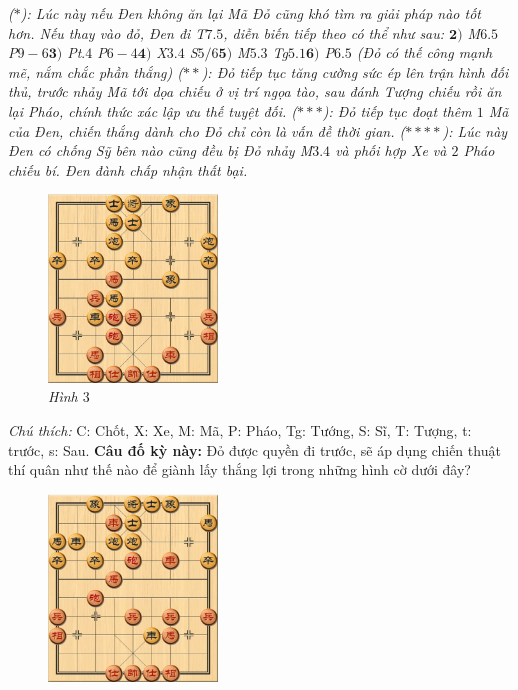 \begin{multicols}{2}
	\vskip 0.1cm
	\textit{($*$): Lúc này nếu Đen không ăn lại Mã Đỏ cũng khó tìm ra giải pháp nào tốt hơn. Nếu thay vào đỏ, Đen đi T$7.5$, diễn biến tiếp theo có thể như sau: $\pmb{2)}$ M$6.5$ P$9-6$\quad $\pmb{3)}$ Pt$.4$ P$6-4$\quad $\pmb{4)}$ X$3.4$ S$5/6$\quad $\pmb{5)}$ M$5.3$ Tg$5.1$\quad $\pmb{6)}$ P$6.5$ (Đỏ có thế công mạnh mẽ, nắm chắc phần thắng)
	\vskip 0.1cm
	($**$): Đỏ tiếp tục tăng cường sức ép lên trận hình đối thủ, trước nhảy Mã tới dọa chiếu ở vị trí ngọa tào, sau đánh Tượng chiếu rồi ăn lại Pháo, chính thức xác lập ưu thế tuyệt đối.
	\vskip 0.1cm
	($***$): Đỏ tiếp tục đoạt thêm $1$ Mã của Đen, chiến thắng dành cho Đỏ chỉ còn là vấn đề thời gian.
	\vskip 0.1cm
	($****$): Lúc này Đen có chống Sỹ bên nào cũng đều bị Đỏ nhảy M$3.4$ và phối hợp Xe và $2$ Pháo chiếu bí. Đen đành chấp nhận thất bại.}
	\begin{figure}[H]
		\vspace*{-5pt}
		\centering
		\captionsetup{labelformat= empty, justification=centering}
		\includegraphics[width= 0.4\textwidth]{3}
		\caption{\small\textit{\color{gocco}Hình $3$}}
		\vspace*{-10pt}
	\end{figure}
	\textit{Chú thích:} C: Chốt, X: Xe, M: Mã, P: Pháo, Tg: Tướng, S: Sĩ, T: Tượng, t: trước, s: Sau. 
	\vskip 0.1cm
	\textbf{\color{gocco}Câu đố kỳ này:} Đỏ được quyền đi trước, sẽ áp dụng chiến thuật thí quân như thế nào để giành lấy thắng lợi trong những hình cờ dưới đây?
	\begin{figure}[H]
		\vspace*{5pt}
		\centering
		\captionsetup{labelformat= empty, justification=centering}
		\includegraphics[width= 0.4\textwidth]{4}

\end{figure}
\end{multicols}
